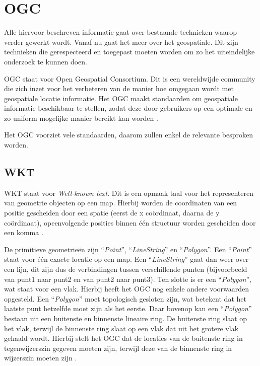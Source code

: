 \section{OGC}
\label{sec:ogc}

Alle hiervoor beschreven informatie gaat over bestaande technieken waarop verder gewerkt wordt. Vanaf nu gaat het meer over het geospatiale. Dit zijn technieken die gerespecteerd en toegepast moeten worden om zo het uiteindelijke onderzoek te kunnen doen. 

OGC staat voor Open Geospatial Consortium. Dit is een wereldwijde community die zich inzet voor het verbeteren van de manier hoe omgegaan wordt met geospatiale locatie informatie. Het OGC maakt standaarden om geospatiale informatie beschikbaar te stellen, zodat deze door gebruikers op een optimale en zo uniform mogelijke manier bereikt kan worden \cite{ogcdocs}.

Het OGC voorziet vele standaarden, daarom zullen enkel de relevante besproken worden.

\subsection{WKT}
WKT staat voor \textit{Well-known text}. Dit is een opmaak taal voor het representeren van geometrie objecten op een map. Hierbij worden de coordinaten van een positie gescheiden door een spatie (eerst de x coördinaat, daarna de y coördinaat), opeenvolgende posities binnen één structuur worden gescheiden door een komma \cite{ogcdocs}. 

De primitieve geometrieën zijn ``\textit{Point}'', ``\textit{LineString}'' en ``\textit{Polygon}''. Een ``\textit{Point}'' staat voor één exacte locatie op een map. Een ``\textit{LineString}'' gaat dan weer over een lijn, dit zijn dus de verbindingen tussen verschillende punten (bijvoorbeeld van punt1 naar punt2 en van punt2 naar punt3). Ten slotte is er een ``\textit{Polygon}'', wat staat voor een vlak. Hierbij heeft het OGC nog enkele andere voorwaarden opgesteld. Een ``\textit{Polygon}'' moet topologisch gesloten zijn, wat betekent dat het laatste punt hetzelfde moet zijn als het eerste. Daar bovenop kan een ``\textit{Polygon}'' bestaan uit een buitenste en binnenste lineaire ring. De buitenste ring slaat op het vlak, terwijl de binnenste ring slaat op een vlak dat uit het grotere vlak gehaald wordt. Hierbij stelt het OGC dat de locaties van de buitenste ring in tegenwijzerszin gegeven moeten zijn, terwijl deze van de binnenste ring in wijzerszin moeten zijn \cite{ogcdocs}.


